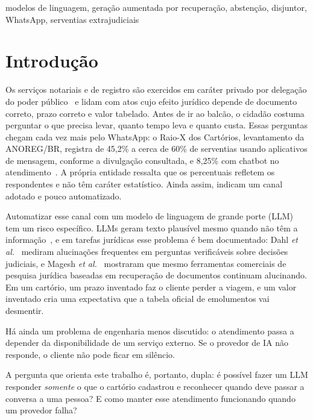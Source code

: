 \documentclass[conference]{IEEEtran}
\begin{document}
\begin{IEEEkeywords}
modelos de linguagem, geração aumentada por recuperação, abstenção, disjuntor, WhatsApp, serventias extrajudiciais
\end{IEEEkeywords}

\section{Introdução}

Os serviços notariais e de registro são exercidos em caráter privado por delegação do poder público~\cite{lei8935} e lidam com atos cujo efeito jurídico depende de documento correto, prazo correto e valor tabelado. Antes de ir ao balcão, o cidadão costuma perguntar o que precisa levar, quanto tempo leva e quanto custa. Essas perguntas chegam cada vez mais pelo WhatsApp: o Raio-X dos Cartórios, levantamento da ANOREG/BR, registra de 45,2\% a cerca de 60\% de serventias usando aplicativos de mensagem, conforme a divulgação consultada, e 8,25\% com chatbot no atendimento~\cite{anoregraiox,arpenraiox}. A própria entidade ressalta que os percentuais refletem os respondentes e não têm caráter estatístico. Ainda assim, indicam um canal adotado e pouco automatizado.

Automatizar esse canal com um modelo de linguagem de grande porte (LLM) tem um risco específico. LLMs geram texto plausível mesmo quando não têm a informação~\cite{ji2023,kalai2025}, e em tarefas jurídicas esse problema é bem documentado: Dahl \emph{et al.}~\cite{dahl2024} mediram alucinações frequentes em perguntas verificáveis sobre decisões judiciais, e Magesh \emph{et al.}~\cite{magesh2025} mostraram que mesmo ferramentas comerciais de pesquisa jurídica baseadas em recuperação de documentos continuam alucinando. Em um cartório, um prazo inventado faz o cliente perder a viagem, e um valor inventado cria uma expectativa que a tabela oficial de emolumentos vai desmentir.

Há ainda um problema de engenharia menos discutido: o atendimento passa a depender da disponibilidade de um serviço externo. Se o provedor de IA não responde, o cliente não pode ficar em silêncio.

A pergunta que orienta este trabalho é, portanto, dupla: é possível fazer um LLM responder \emph{somente} o que o cartório cadastrou e reconhecer quando deve passar a conversa a uma pessoa? E como manter esse atendimento funcionando quando um provedor falha?
\end{document}
